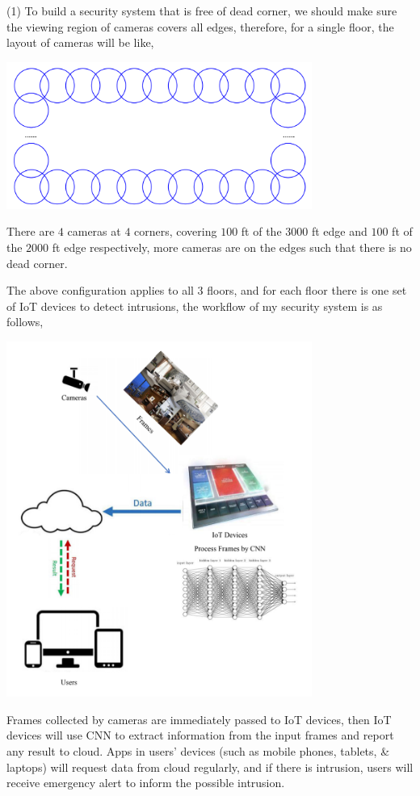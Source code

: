 \documentclass[11pt]{article}
\begin{document}
\begin{solution}
\item (1) To build a security system that is free of dead corner, we should make sure the viewing region of cameras covers all edges, therefore, for a single floor, the layout of cameras will be like, 
\begin{center}
\includegraphics[width=10cm]{6.png}
\end{center}
There are $4$ cameras at $4$ corners, covering $100$ ft of the $3000$ ft edge and $100$ ft of the $2000$ ft edge respectively, more cameras are on the edges such that there is no dead corner.
\item The above configuration applies to all $3$ floors, and for each floor there is one set of IoT devices to detect intrusions, the workflow of my security system is as follows,
\begin{center}
\includegraphics[width=10cm]{7.png}
\end{center}
\pagebreak
\item Frames collected by cameras are immediately passed to IoT devices, then IoT devices will use CNN to extract information from the input frames and report any result to cloud. Apps in users' devices (such as mobile phones, tablets, \& laptops) will request data from cloud regularly, and if there is intrusion, users will receive emergency alert to inform the possible intrusion.

\end{solution}
\end{document}
